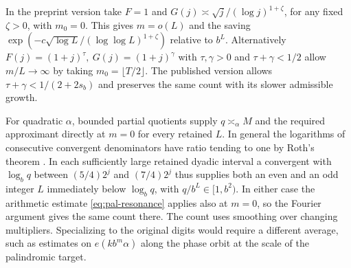 In the preprint version take \(F=1\) and \(G(j)\asymp\sqrt j/(\log j)^{1+\zeta}\), for any fixed \(\zeta>0\), with \(m_0=0\). This gives \(m=o(L)\) and the saving \(\exp(-c\sqrt{\log L}/(\log\log L)^{1+\zeta})\) relative to \(b^L\). Alternatively \(F(j)=(1+j)^\tau,\ G(j)=(1+j)^\gamma\) with \(\tau,\gamma>0\) and \(\tau+\gamma<1/2\) allow \(m/L\to\infty\) by taking \(m_0=\lfloor T/2\rfloor\). The published version allows \(\tau+\gamma<1/(2+2s_b)\) and preserves the same count with its slower admissible growth.

For quadratic \(\alpha\), bounded partial quotients supply \(q\asymp_\alpha M\) and the required approximant directly at \(m=0\) for every retained \(L\). In general the logarithms of consecutive convergent denominators have ratio tending to one by Roth's theorem \cite{RothClassic}. In each sufficiently large retained dyadic interval a convergent with \(\log_b q\) between \((5/4)2^j\) and \((7/4)2^j\) thus supplies both an even and an odd integer \(L\) immediately below \(\log_b q\), with \(q/b^L\in[1,b^2)\). In either case the arithmetic estimate \eqref{eq:pal-resonance} applies also at \(m=0\), so the Fourier argument gives the same count there. The count uses smoothing over changing multipliers. Specializing to the original digits would require a different average, such as estimates on \(e(k b^m\alpha)\) along the phase orbit at the scale of the palindromic target.
